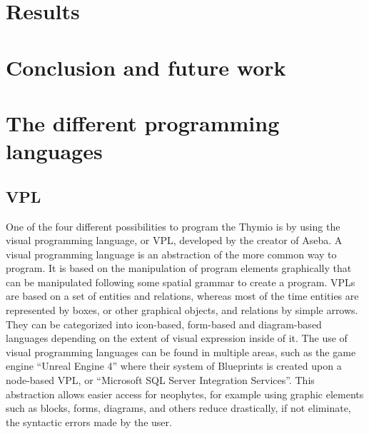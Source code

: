 \documentclass{scrbook}
\begin{document}
\chapter{Results}





                

\chapter{Conclusion and future work}

\appendix

\chapter{The different programming languages \label{fourlanguages}} 
\section{VPL}

One of the four different possibilities to program the Thymio is by using the visual programming language, or VPL, 
developed by the creator of Aseba. A visual programming language is an abstraction of the more common way to program. 
It is based on the manipulation of program elements graphically that can be manipulated following some spatial grammar to create a program. 
VPLs are based on a set of entities and relations, whereas most of the time entities are represented by boxes, 
or other graphical objects, and relations by simple arrows. They can be categorized into icon-based, 
form-based and diagram-based languages depending on the extent of visual expression inside of it. 
The use of visual programming languages can be found in multiple areas, such as the game engine “Unreal Engine 4” where their system of Blueprints is created upon a node-based VPL, 
or “Microsoft SQL Server Integration Services”. This abstraction allows easier access for neophytes, 
for example using graphic elements such as blocks, forms, diagrams, and others reduce drastically, if not eliminate, the syntactic errors made by the user.\\
\end{document}
